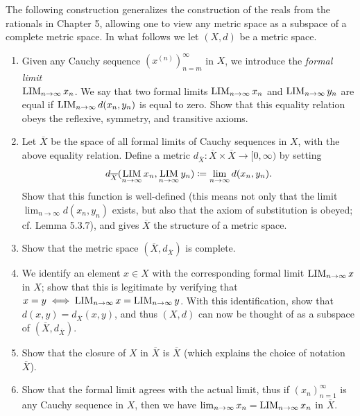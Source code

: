 \begin{ex}\label{ii:ex:1.4.8}
  The following construction generalizes the construction of the reals from the rationals in Chapter 5, allowing one to view any metric space as a subspace of a complete metric space.
  In what follows we let \((X, d)\) be a metric space.
  \begin{enumerate}
    \item\label{ii:ex:1.4.8.a} Given any Cauchy sequence \((x^{(n)})_{n = m}^\infty\) in \(X\), we introduce the \emph{formal limit} \\
    \(\operatorname*{LIM}_{n \to \infty} x_n\).
    We say that two formal limits \(\operatorname*{LIM}_{n \to \infty} x_n\) and \(\operatorname*{LIM}_{n \to \infty} y_n\) are equal if \(\operatorname*{LIM}_{n \to \infty} d(x_n, y_n)\) is equal to zero.
    Show that this equality relation obeys the reflexive, symmetry, and transitive axioms.
    \item\label{ii:ex:1.4.8.b} Let \(\overline{X}\) be the space of all formal limits of Cauchy sequences in \(X\), with the above equality relation.
    Define a metric \(d_{\overline{X}} : \overline{X} \times \overline{X} \to [0, \infty)\) by setting
    \[
      d_{\overline{X}}(\operatorname*{LIM}_{n \to \infty} x_n, \operatorname*{LIM}_{n \to \infty} y_n) \coloneqq \lim_{n \to \infty} d(x_n, y_n).
    \]
    Show that this function is well-defined (this means not only that the limit \\
    \(\lim_{n \to \infty} d(x_n, y_n)\) exists, but also that the axiom of substitution is obeyed;
    cf. Lemma 5.3.7), and gives \(\overline{X}\) the structure of a metric space.
    \item\label{ii:ex:1.4.8.c} Show that the metric space \((\overline{X}, d_{\overline{X}})\) is complete.
    \item\label{ii:ex:1.4.8.d} We identify an element \(x \in X\) with the corresponding formal limit \(\operatorname*{LIM}_{n \to \infty} x\) in \(X\);
    show that this is legitimate by verifying that \(x = y \iff \operatorname*{LIM}_{n \to \infty} x = \operatorname*{LIM}_{n \to \infty} y\).
    With this identification, show that \(d(x, y) = d_{\overline{X}}(x, y)\), and thus \((X, d)\) can now be thought of as a subspace of \((\overline{X}, d_{\overline{X}})\).
    \item\label{ii:ex:1.4.8.e} Show that the closure of \(X\) in \(\overline{X}\) is \(\overline{X}\) (which explains the choice of notation \(\overline{X}\)).
    \item\label{ii:ex:1.4.8.f} Show that the formal limit agrees with the actual limit, thus if \((x_n)_{n = 1}^\infty\) is any Cauchy sequence in \(X\), then we have \(\lim_{n \to \infty} x_n = \operatorname*{LIM}_{n \to \infty} x_n\) in \(\overline{X}\).
  \end{enumerate}
\end{ex}

